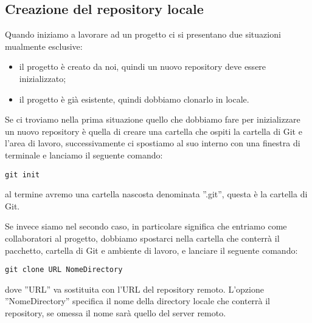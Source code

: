 \subsection{Creazione del repository locale}
Quando iniziamo a lavorare ad un progetto ci si presentano due situazioni mualmente esclusive:

\begin{itemize}
\item il progetto è creato da noi, quindi un nuovo repository deve essere inizializzato;
\item il progetto è già esistente, quindi dobbiamo clonarlo in locale.
\end{itemize}

Se ci troviamo nella prima situazione quello che dobbiamo fare per inizializzare un nuovo repository è quella di creare una cartella che ospiti la cartella di Git e l'area di lavoro, successivamente ci spostiamo al suo interno con una finestra di terminale e lanciamo il seguente comando:

\begin{center}
\texttt{git init}
\end{center}

al termine avremo una cartella nascosta denominata ''.git'', questa è la cartella di Git.

Se invece siamo nel secondo caso, in particolare significa che entriamo come collaboratori al progetto, dobbiamo spostarci nella cartella che conterrà il pacchetto, cartella di Git e ambiente di lavoro, e lanciare il seguente comando:

\begin{center}
\texttt{git clone URL NomeDirectory}
\end{center}

dove ''URL'' va sostituita con l'URL del repository remoto. L'opzione ''NomeDirectory'' specifica il nome della directory locale che conterrà il repository, se omessa il nome sarà quello del server remoto.